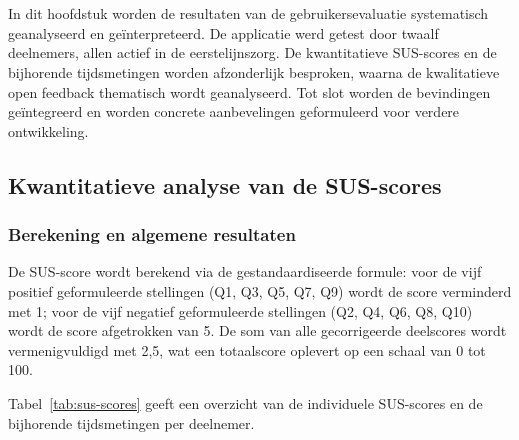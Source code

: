 \chapter{}%
\label{ch:analyse}

In dit hoofdstuk worden de resultaten van de gebruikersevaluatie systematisch geanalyseerd en geïnterpreteerd.
De applicatie werd getest door twaalf deelnemers, allen actief in de eerstelijnszorg.
De kwantitatieve SUS-scores en de bijhorende tijdsmetingen worden afzonderlijk besproken, waarna de kwalitatieve open feedback thematisch wordt geanalyseerd.
Tot slot worden de bevindingen geïntegreerd en worden concrete aanbevelingen geformuleerd voor verdere ontwikkeling.

\section{Kwantitatieve analyse van de SUS-scores}
\label{sec:susscores}

\subsection{Berekening en algemene resultaten}
 
De SUS-score wordt berekend via de gestandaardiseerde formule: voor de vijf positief geformuleerde stellingen (Q1, Q3, Q5, Q7, Q9) wordt de score verminderd met 1; voor de vijf negatief geformuleerde stellingen (Q2, Q4, Q6, Q8, Q10) wordt de score afgetrokken van 5.
De som van alle gecorrigeerde deelscores wordt vermenigvuldigd met 2,5, wat een totaalscore oplevert op een schaal van 0 tot 100.
\medskip

Tabel~\ref{tab:sus-scores} geeft een overzicht van de individuele SUS-scores en de bijhorende tijdsmetingen per deelnemer.
 
